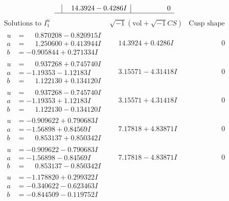 \documentclass[1p]{elsarticle_modified}
\theoremstyle{definition}
\newcommand{\I}{\sqrt{-1}}
\begin{document}
$$\begin{array}{c|c|c}
 & \phantom{-}14.3924 - 0.4286 I & \phantom{-0.000000 } 0\\
 \hline 
 \end{array}$$\newpage$$\begin{array}{c|c|c}  
\text{Solutions to }I^u_{1}& \I (\text{vol} + \sqrt{-1}CS) & \text{Cusp shape}\\
 \hline 
\begin{aligned}
u &= \phantom{-}0.870208 - 0.820915 I \\
a &= \phantom{-}1.250600 + 0.413944 I \\
b &= -0.905844 + 0.271334 I\end{aligned}
 & \phantom{-}14.3924 + 0.4286 I & \phantom{-0.000000 } 0 \\ \hline\begin{aligned}
u &= \phantom{-}0.937268 + 0.745740 I \\
a &= -1.19353 - 1.12183 I \\
b &= \phantom{-}1.122130 + 0.134120 I\end{aligned}
 & \phantom{-}3.15571 - 4.31418 I & \phantom{-0.000000 } 0 \\ \hline\begin{aligned}
u &= \phantom{-}0.937268 - 0.745740 I \\
a &= -1.19353 + 1.12183 I \\
b &= \phantom{-}1.122130 - 0.134120 I\end{aligned}
 & \phantom{-}3.15571 + 4.31418 I & \phantom{-0.000000 } 0 \\ \hline\begin{aligned}
u &= -0.909622 + 0.790683 I \\
a &= -1.56898 + 0.84569 I \\
b &= \phantom{-}0.853137 + 0.850342 I\end{aligned}
 & \phantom{-}7.17818 + 4.83871 I & \phantom{-0.000000 } 0 \\ \hline\begin{aligned}
u &= -0.909622 - 0.790683 I \\
a &= -1.56898 - 0.84569 I \\
b &= \phantom{-}0.853137 - 0.850342 I\end{aligned}
 & \phantom{-}7.17818 - 4.83871 I & \phantom{-0.000000 } 0 \\ \hline\begin{aligned}
u &= -1.178820 + 0.299322 I \\
a &= -0.340622 - 0.623463 I \\
b &= -0.844509 - 0.119752 I\end{aligned}

\end{array}$$
\end{document}
